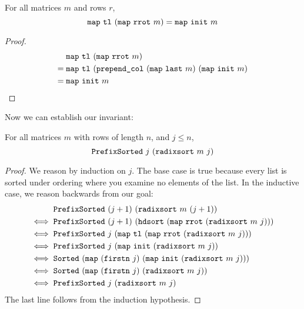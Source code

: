 \documentclass[sigplan,10pt,anonymous,review]{thesis}
\begin{document}
\begin{corollary}
  For all matrices $m$ and rows $r$,
  \begin{equation*}
    \texttt{\textup{map}}~\texttt{\textup{tl}}~(\texttt{\textup{map}}~\texttt{\textup{rrot}}~m) = \texttt{\textup{map}}~\texttt{\textup{init}}~m
  \end{equation*}
\end{corollary}
\begin{proof}
  \begin{align*}
    {}& \texttt{\textup{map}}~\texttt{\textup{tl}}~(\texttt{\textup{map}}~\texttt{\textup{rrot}}~m) \\
    ={}& \texttt{\textup{map}}~\texttt{\textup{tl}}~(\texttt{\textup{prepend\_col}}~(\texttt{\textup{map}}~\texttt{\textup{last}}~m)~(\texttt{\textup{map}}~\texttt{\textup{init}}~m) \\
    ={}& \texttt{\textup{map}}~\texttt{\textup{init}}~m \qedhere
  \end{align*}
\end{proof}

Now we can establish our invariant:

\begin{lemma}
  For all matrices $m$ with rows of length $n$, and $j \le n$,
  \begin{equation*}
    \texttt{\textup{PrefixSorted}}~j~(\texttt{\textup{radixsort}}~m~j)
  \end{equation*}
\end{lemma}
\begin{proof}
  We reason by induction on $j$. The base case is true because every
  list is sorted under ordering where you examine no elements of the
  list. In the inductive case, we reason backwards from our goal:
  \begin{align*}
       &\texttt{\textup{PrefixSorted}}~(j+1)~(\texttt{\textup{radixsort}}~m~(j+1)) \\
    \iff{}&\texttt{\textup{PrefixSorted}}~(j+1)~(\texttt{\textup{hdsort}}~(\texttt{\textup{map}}~\texttt{\textup{rrot}}~(\texttt{\textup{radixsort}}~m~j))) \\
    \iff{}&\texttt{\textup{PrefixSorted}}~j~(\texttt{\textup{map}}~\texttt{\textup{tl}}~(\texttt{\textup{map}}~\texttt{\textup{rrot}}~(\texttt{\textup{radixsort}}~m~j))) \\
    \iff{}&\texttt{\textup{PrefixSorted}}~j~(\texttt{\textup{map}}~\texttt{\textup{init}}~(\texttt{\textup{radixsort}}~m~j)) \\
    \iff{}&\texttt{\textup{Sorted}}~(\texttt{\textup{map}}~(\texttt{\textup{firstn}}~j)~(\texttt{\textup{map}}~\texttt{\textup{init}}~(\texttt{\textup{radixsort}}~m~j))) \\
    \iff{}&\texttt{\textup{Sorted}}~(\texttt{\textup{map}}~(\texttt{\textup{firstn}}~j)~(\texttt{\textup{radixsort}}~m~j)) \\
    \iff{}&\texttt{\textup{PrefixSorted}}~j~(\texttt{\textup{radixsort}}~m~j)
  \end{align*}
  The last line follows from the induction hypothesis.
\end{proof}
\end{document}
